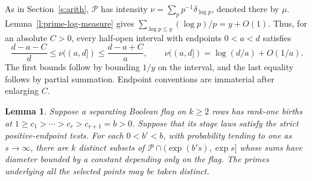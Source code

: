 \documentclass[11pt]{article}
\newtheorem{lemma}[theorem]{Lemma}
\numberwithin{equation}{section}
\begin{document}
As in Section~\ref{s:arith}, $\mathcal P$ has intensity
$\nu=\sum_p p^{-1}\delta_{\log p}$, denoted there by $\mu$.
Lemma~\ref{l:prime-log-measure} gives
$\sum_{\log p\le y}(\log p)/p=y+O(1)$.
Thus, for an absolute $C>0$, every half-open interval with endpoints
$0<a<d$ satisfies
\begin{equation}
 \frac{d-a-C}{d}\le\nu((a,d])\le\frac{d-a+C}{a},\qquad
 \nu((a,d])=\log(d/a)+O(1/a).                              \label{e:real-intensity}
\end{equation}
The first bounds follow by bounding $1/y$ on the interval, and the
last equality follows by partial summation. Endpoint conventions are
immaterial after enlarging $C$.

\begin{lemma}\label{l:realization}
Suppose a separating Boolean flag on $k\ge2$ rows has rank-one births
at $1\ge c_1>\cdots>c_r>c_{r+1}=b>0$. Suppose that its stage laws
satisfy the strict positive-endpoint tests. For each $0<b'<b$, with
probability tending to one as $s\to\infty$, there are $k$ distinct
subsets of $\mathcal P\cap(\exp(b's),\exp s]$ whose sums have
diameter bounded by a constant depending only on the flag. The primes
underlying all the selected points may be taken distinct.
\end{lemma}
\end{document}
